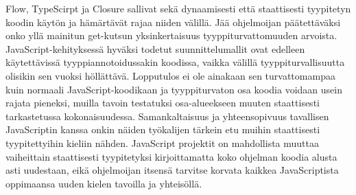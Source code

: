 Flow, TypeScirpt ja Closure sallivat sekä dynaamisesti että
staattisesti tyypitetyn koodin käytön ja hämärtävät rajaa niiden välillä.
Jää ohjelmoijan päätettäväksi onko yllä mainitun get-kutsun yksinkertaisuus
tyyppiturvattomuuden arvoista. JavaScript-kehityksessä hyväksi todetut
suunnittelumallit ovat edelleen käytettävissä tyyppiannotoidussakin
koodissa, vaikka välillä tyyppiturvallisuutta olisikin sen vuoksi höllättävä.
Lopputulos ei ole ainakaan sen turvattomampaa kuin normaali JavaScript-koodikaan
ja tyyppiturvaton osa koodia voidaan usein rajata pieneksi, muilla tavoin
testatuksi osa-alueekseen muuten staattisesti tarkastetussa kokonaisuudessa.
Samankaltaisuus ja yhteensopivuus tavallisen JavaScriptin kanssa onkin
näiden työkalijen tärkein etu muihin staattisesti tyypitettyihin kieliin
nähden. JavaScript projektit on mahdollista muuttaa vaiheittain staattisesti
tyypitetyksi kirjoittamatta koko ohjelman koodia alusta asti uudestaan, eikä
ohjelmoijan itsensä tarvitse korvata kaikkea JavaScriptista oppimaansa
uuden kielen tavoilla ja yhteisöllä. 
